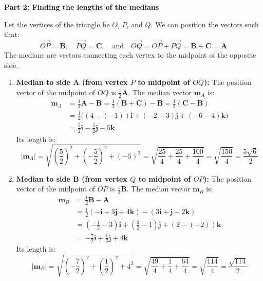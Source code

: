 \documentclass[12pt,a4paper]{article}
\begin{document}
\begin{enumerate}
\begin{tcolorbox}[enhanced,breakable,ansbox,colback=cD!4,colframe=cD,boxrule=0.8pt,arc=5pt,title={\textbf{Answer}},fonttitle=\bfseries\color{white},colbacktitle=cD]
\vspace{1em}
\textbf{Part 2: Finding the lengths of the medians}

Let the vertices of the triangle be $O$, $P$, and $Q$. We can position the vectors such that:
\[ \vec{OP} = \mathbf{B}, \quad \vec{PQ} = \mathbf{C}, \quad \text{and} \quad \vec{OQ} = \vec{OP} + \vec{PQ} = \mathbf{B} + \mathbf{C} = \mathbf{A} \]
The medians are vectors connecting each vertex to the midpoint of the opposite side. 

\begin{enumerate}
    \item \textbf{Median to side $\mathbf{A}$ (from vertex $P$ to midpoint of $OQ$):}
    The position vector of the midpoint of $OQ$ is $\frac{1}{2}\mathbf{A}$. The median vector $\mathbf{m}_A$ is:
    \begin{align*}
        \mathbf{m}_A &= \frac{1}{2}\mathbf{A} - \mathbf{B} = \frac{1}{2}(\mathbf{B} + \mathbf{C}) - \mathbf{B} = \frac{1}{2}(\mathbf{C} - \mathbf{B}) \\
        &= \frac{1}{2} \big( (4 - (-1))\mathbf{i} + (-2 - 3)\mathbf{j} + (-6 - 4)\mathbf{k} \big) \\
        &= \frac{5}{2}\mathbf{i} - \frac{5}{2}\mathbf{j} - 5\mathbf{k}
    \end{align*}
    Its length is:
    \[ |\mathbf{m}_A| = \sqrt{\left(\frac{5}{2}\right)^2 + \left(-\frac{5}{2}\right)^2 + (-5)^2} = \sqrt{\frac{25}{4} + \frac{25}{4} + \frac{100}{4}} = \sqrt{\frac{150}{4}} = \boxed{\frac{5\sqrt{6}}{2}} \]

    \item \textbf{Median to side $\mathbf{B}$ (from vertex $Q$ to midpoint of $OP$):}
    The position vector of the midpoint of $OP$ is $\frac{1}{2}\mathbf{B}$. The median vector $\mathbf{m}_B$ is:
    \begin{align*}
        \mathbf{m}_B &= \frac{1}{2}\mathbf{B} - \mathbf{A} \\
        &= \frac{1}{2}(-\mathbf{i} + 3\mathbf{j} + 4\mathbf{k}) - (3\mathbf{i} + \mathbf{j} - 2\mathbf{k}) \\
        &= \left(-\frac{1}{2} - 3\right)\mathbf{i} + \left(\frac{3}{2} - 1\right)\mathbf{j} + \left(2 - (-2)\right)\mathbf{k} \\
        &= -\frac{7}{2}\mathbf{i} + \frac{1}{2}\mathbf{j} + 4\mathbf{k}
    \end{align*}
    Its length is:
    \[ |\mathbf{m}_B| = \sqrt{\left(-\frac{7}{2}\right)^2 + \left(\frac{1}{2}\right)^2 + 4^2} = \sqrt{\frac{49}{4} + \frac{1}{4} + \frac{64}{4}} = \sqrt{\frac{114}{4}} = \boxed{\frac{\sqrt{114}}{2}} \]


\end{enumerate}
\end{tcolorbox}
\end{enumerate}
\end{document}
